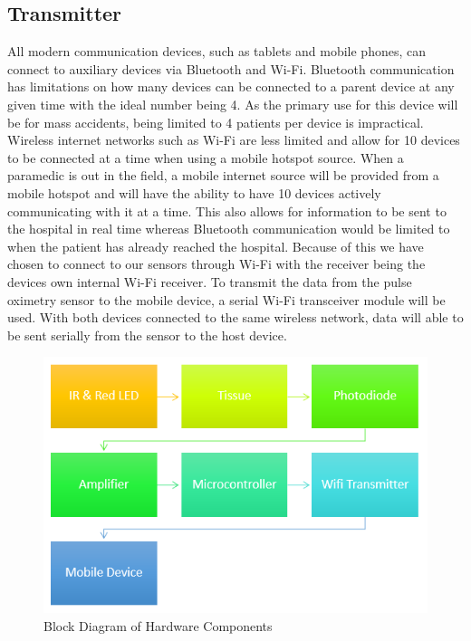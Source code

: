  \subsection{Transmitter}
 All modern communication devices, such as tablets and mobile phones, can connect to auxiliary devices via Bluetooth and Wi-Fi. Bluetooth communication has
 limitations on how many devices can be connected to a parent device at any given time with the ideal number being 4. \cite{apple1} As the primary use for this device
  will be for mass accidents, being limited to 4 patients per device is impractical. Wireless internet networks such as Wi-Fi are less limited and allow for
  10 devices to be connected at a time when using a mobile hotspot source. When a paramedic is out in the field, a mobile internet source will be provided
  from a mobile hotspot and will have the ability to have 10 devices actively communicating with it at a time. This also allows for information to be sent to
  the hospital in real time whereas Bluetooth communication would be limited to when the patient has already reached the hospital. Because of this we have
  chosen to connect to our sensors through Wi-Fi with the receiver being the devices own internal Wi-Fi receiver.
 To transmit the data from the pulse oximetry sensor to the mobile device, a serial Wi-Fi transceiver module will be used. With both devices connected to
 the same wireless network, data will able to be sent serially from the sensor to the host device.
 \begin{figure}[h]
  \centering
  \includegraphics[width=\linewidth]{hardwareFlowchart.PNG}
  \captionsetup{format=hang}
  \caption[Hardware Block Diagram]{Block Diagram of Hardware Components}
  \label{fig:HwardwareDiagram}
\end{figure}

